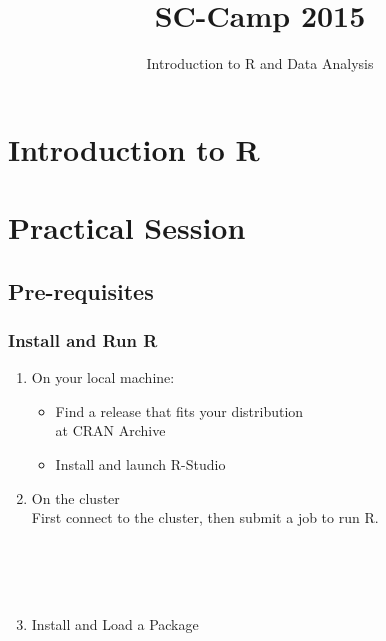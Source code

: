 \documentclass{beamer}
\title{SC-Camp 2015}
\subtitle{Introduction to R and Data Analysis}
\author{\authors}
\institute[UL]{
  University of Luxembourg, Luxembourg
}
\date{}
\begin{document}
\begin{frame}
    \vspace{2.5em}
    \titlepage
\end{frame}



\section{Introduction to R}






\section{Practical Session}
\subsection{Pre-requisites}

\begin{frame}[fragile]
    \frametitle{Install and Run R}
    \begin{enumerate}
      \item On your local machine:
		\begin{itemize}
			\item Find a release that fits your distribution\\ at CRAN Archive\hfill{}
			\item Install and launch R-Studio\hfill{}
		\end{itemize}
      \item On the cluster\\
       First connect to the cluster, then submit a job to run R.
        \begin{cmdline}
            \\
            \\
            \\
        \end{cmdline}
        \item Install and Load a Package
            \begin{cmdline}
              \\
              \\
            \end{cmdline}
    \end{enumerate}
\end{frame}
\end{document}
